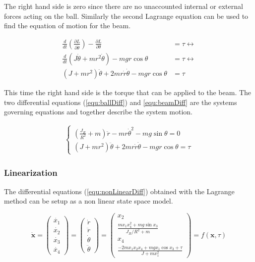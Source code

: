 \documentclass[a4paper, titlepage]{article}
\begin{document}
The right hand side is zero since there are no unaccounted internal or external forces acting on the ball.
Similarly the second Lagrange equation can be used to find the equation of motion for the beam.

\begin{equation}
\begin{split}
\frac{d}{dt}\left(\frac{\partial L}{\partial \dot{\theta}}\right) - \frac{\partial L}{\partial \theta} &= \tau \leftrightarrow \\
\frac{d}{dt}\left(J\dot{\theta} + mr^2\dot{\theta}\right) - mgr\cos{\theta} &= \tau \leftrightarrow \\
(J + mr^2)\ddot{\theta} + 2mr\dot{r}\dot{\theta} - mgr\cos{\theta} &= \tau
\end{split}
\label{equ:beamDiff}
\end{equation}

This time the right hand side is the torque that can be applied to the beam.
The two differential equations (\ref{equ:ballDiff}) and \ref{equ:beamDiff} are the systems governing equations and together describe the system motion.

\begin{equation}
\begin{split}
\begin{cases}
\left(\frac{J_R}{R^2} + m\right)\ddot{r} - mr\dot{\theta}^2 - mg\sin{\theta} = 0 \\
(J + mr^2)\ddot{\theta} + 2mr\dot{r}\dot{\theta} - mgr\cos{\theta} = \tau
\end{cases}
\end{split}
\label{equ:nonLinearDiff}
\end{equation}

\subsubsection{Linearization}
The differential equations (\ref{equ:nonLinearDiff}) obtained with the Lagrange method can be setup as a non linear state space model.

\begin{equation}
\dot{\textbf{x}} = 
\begin{pmatrix}
\dot{x_1} \\ \dot{x_2} \\ \dot{x_3} \\ \dot{x_4}
\end{pmatrix} = 
\begin{pmatrix}
\dot{r} \\ \ddot{r} \\ \dot{\theta} \\ \ddot{\theta}
\end{pmatrix} = 
\begin{pmatrix}
x_2 \\ 
\frac{mx_1x_4^2 + mg\sin{x_3}}{J_R/R^2 + m} \\ 
x_4 \\ 
\frac{- 2mx_1x_2x_4 + mgx_1\cos{x_3} + \tau}{J + mx_1^2}
\end{pmatrix} = f(\textbf{x}, \tau)
\label{equ:nonLinSs}
\end{equation}
\end{document}
